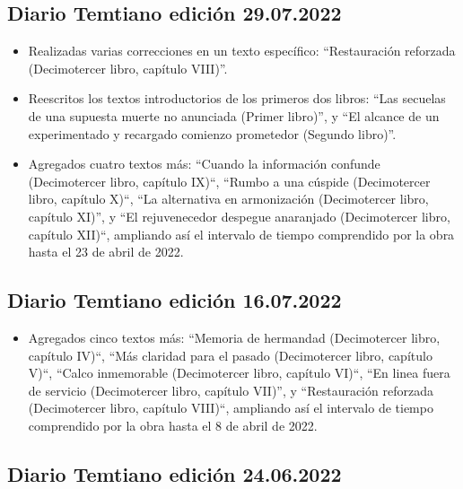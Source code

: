 \documentclass[
]{book}
\providecommand{\tightlist}{%
  \setlength{\itemsep}{0pt}\setlength{\parskip}{0pt}}
\begin{document}
\hypertarget{diario-temtiano-ediciuxf3n-29.07.2022}{%
\subsection*{Diario Temtiano edición 29.07.2022}\label{diario-temtiano-ediciuxf3n-29.07.2022}}

\begin{itemize}
\item
  Realizadas varias correcciones en un texto específico: ``Restauración reforzada (Decimotercer libro, capítulo VIII)''.
\item
  Reescritos los textos introductorios de los primeros dos libros: ``Las secuelas de una supuesta muerte no anunciada (Primer libro)'', y ``El alcance de un experimentado y recargado comienzo prometedor (Segundo libro)''.
\item
  Agregados cuatro textos más: ``Cuando la información confunde (Decimotercer libro, capítulo IX)``, ``Rumbo a una cúspide (Decimotercer libro, capítulo X)``, ``La alternativa en armonización (Decimotercer libro, capítulo XI)'', y ``El rejuvenecedor despegue anaranjado (Decimotercer libro, capítulo XII)``, ampliando así el intervalo de tiempo comprendido por la obra hasta el 23 de abril de 2022.
\end{itemize}

\hypertarget{diario-temtiano-ediciuxf3n-16.07.2022}{%
\subsection*{Diario Temtiano edición 16.07.2022}\label{diario-temtiano-ediciuxf3n-16.07.2022}}

\begin{itemize}
\tightlist
\item
  Agregados cinco textos más: ``Memoria de hermandad (Decimotercer libro, capítulo IV)``, ``Más claridad para el pasado (Decimotercer libro, capítulo V)``, ``Calco inmemorable (Decimotercer libro, capítulo VI)``, ``En linea fuera de servicio (Decimotercer libro, capítulo VII)'', y ``Restauración reforzada (Decimotercer libro, capítulo VIII)``, ampliando así el intervalo de tiempo comprendido por la obra hasta el 8 de abril de 2022.
\end{itemize}

\hypertarget{diario-temtiano-ediciuxf3n-24.06.2022}{%
\subsection*{Diario Temtiano edición 24.06.2022}\label{diario-temtiano-ediciuxf3n-24.06.2022}}
\end{document}
